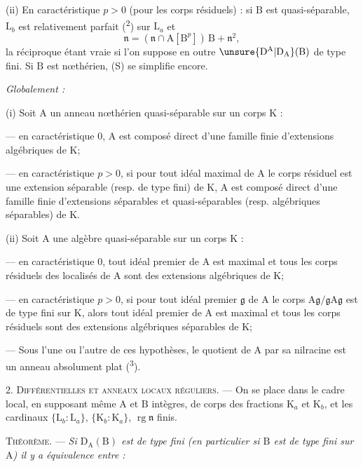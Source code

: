 
(ii) En caractéristique $p>0$ (pour les corps résiduels) : si $\mathrm B$ est quasi-séparable, $\mathrm L_b$ est relativement parfait (\textsuperscript{2}) sur $\mathrm L_a$ et
\[
\mathfrak n=(\mathfrak n\cap\mathrm A[\mathrm B^p])\,\mathrm B+\mathfrak n^2,\tag*{(S)}
\]
la réciproque étant vraie si l’on suppose en outre $\unsure{\mathrm D^{\mathrm A}|\mathrm D_{\mathrm A}}(\mathrm B)$ de type fini. Si $\mathrm B$ est nœthérien, (S) se simplifie encore.

\textit{Globalement :}

(i) Soit $\mathrm A$ un anneau nœthérien quasi-séparable sur un corps $\mathrm K$ :

--- en caractéristique $0$, $\mathrm A$ est composé direct d’une famille finie d’extensions algébriques de $\mathrm K$;

--- en caractéristique $p>0$, si pour tout idéal maximal de $\mathrm A$ le corps résiduel est une extension séparable (resp. de type fini) de $\mathrm K$, $\mathrm A$ est composé direct d’une famille finie d’extensions séparables et quasi-séparables (resp. algébriques séparables) de $\mathrm K$.

(ii) Soit $\mathrm A$ une algèbre quasi-séparable sur un corps $\mathrm K$ :

--- en caractéristique $0$, tout idéal premier de $\mathrm A$ est maximal et tous les corps résiduels des localisés de $\mathrm A$ sont des extensions algébriques de $\mathrm K$;

--- en caractéristique $p>0$, si pour tout idéal premier $\mathfrak g$ de $\mathrm A$ le corps $\mathrm A\mathfrak g/\mathfrak g\mathrm A\mathfrak g$ est de type fini sur $\mathrm K$, alors tout idéal premier de $\mathrm A$ est maximal et tous les corps résiduels sont des extensions algébriques séparables de $\mathrm K$;

--- Sous l’une ou l’autre de ces hypothèses, le quotient de $\mathrm A$ par sa nilracine est un anneau absolument plat (\textsuperscript{3}).

2. \textsc{Différentielles et anneaux locaux réguliers.} --- On se place dans le cadre local, en supposant même $\mathrm A$ et $\mathrm B$ intègres, de corps des fractions $\mathrm K_a$ et $\mathrm K_b$, et les cardinaux $\{\mathrm L_b:\mathrm L_a\}$, $\{\mathrm K_b:\mathrm K_a\}$, $\operatorname{rg}\mathfrak n$ finis.

\textsc{Théorème.} --- \textit{Si $\mathrm D_{\mathrm A}(\mathrm B)$ est de type fini (en particulier si $\mathrm B$ est de type fini sur $\mathrm A$) il y a équivalence entre :}

